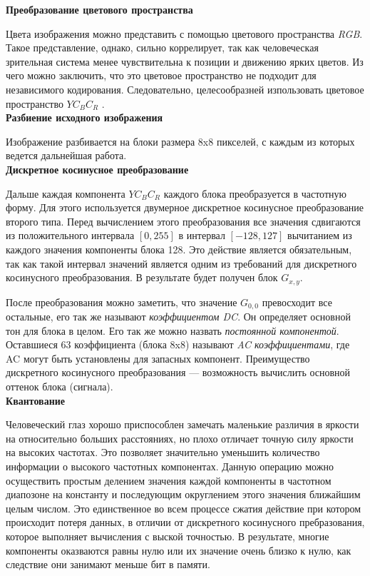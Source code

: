 \documentclass{matmex-diploma-custom}
\begin{document}
\textbf{Преобразование цветового пространства} \newline

Цвета изображения можно  представить с помощью цветового пространства \emph{RGB}. Такое представление, однако,
сильно коррелирует, так как человеческая зрительная система менее чувствительна к позиции и движению ярких  цветов. Из чего можно заключить, что это цветовое пространство не подходит для независимого кодирования. Следовательно, целесообразней изпользовать цветовое пространство $YC_{B}C_{R}$ \cite{mpeg2}.\\

\textbf{Разбиение исходного изображения}\newline

Изображение разбивается на блоки размера  8x8 пикселей, с каждым из которых ведется дальнейшая работа.\\

\textbf{Дискретное косинусное преобразование}\newline

Дальше каждая компонента $YC_{B}C_{R}$ каждого блока преобразуется в частотную форму. Для  этого используется двумерное дискретное косинусное преобразование второго типа. Перед вычислением этого преобразования все значения сдвигаются из положительного интервала $[0,255]$ в интервал $[-128, 127]$ вычитанием из каждого значения компоненты блока 128. Это действие является обязательным, так как такой интервал значений является одним из требований для дискретного косинусного преобразования. В результате будет получен блок $G_{x,y}$.\newline

  После преобразования можно заметить, что значение $ G_{0,0} $  превосходит все остальные, его так же называют
  \emph{коэффициентом DC}. Он определяет основной тон для блока в целом. Его так же можно назвать
  \emph{постоянной компонентой}. Оставшиеся 63 коэффициента (блока 8x8) называют \emph{AC
  коэффициентами}, где AC могут быть установлены для запасных компонент.
  Преимущество дискретного косинусного преобразования --- возможность вычислить основной оттенок блока (сигнала).\\

\textbf{Квантование}\newline

Человеческий глаз  хорошо приспособлен замечать маленькие различия в яркости на относительно больших расстояниях, но плохо отличает точную силу яркости на высоких частотах. Это позволяет значительно уменьшить количество информации о высокого частотных компонентах. Данную операцию можно  осуществить простым делением значения  каждой компоненты в частотном диапозоне на константу и последующим округлением этого значения ближайшим целым числом. Это единственное во всем процессе сжатия действие при котором происходит потеря данных, в отличии от дискретного косинусного пребразования, которое выполняет вычисления с выской точностью. В результате, многие компоненты оказваются равны  нулю или их значение очень близко к нулю, как следствие они занимают меньше бит в памяти.
\end{document}
